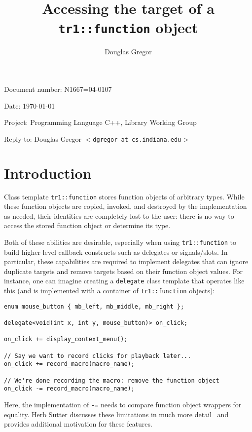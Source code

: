 \documentclass{article}
\begin{document}
\pagestyle{myheadings}

\title{Accessing the target of a \texttt{tr1::function} object}
\author{Douglas Gregor}
\date{}
\maketitle

\par\noindent Document number: N1667=04-0107
\par\noindent Date: \today
\par\noindent Project: Programming Language C++, Library Working Group
\par\noindent Reply-to: Douglas Gregor $<${\tt dgregor at cs.indiana.edu}$>$

\section{Introduction}
Class template \texttt{tr1::function} stores function objects of
arbitrary types. While these function objects are copied, invoked, and
destroyed by the implementation as needed, their identities are
completely lost to the user: there is no way to access the stored
function object or determine its type. 

Both of these abilities are desirable, especially when
using \texttt{tr1::function} to build higher-level callback constructs
such as delegates or signals/slots. In particular, these capabilities
are required to implement delegates that can ignore duplicate targets
and remove targets based on their function object values. For
instance, one can imagine creating a \texttt{delegate} class template
that operates like this (and is implemented with a container of
\texttt{tr1::function} objects):

\begin{verbatim}
enum mouse_button { mb_left, mb_middle, mb_right };

delegate<void(int x, int y, mouse_button)> on_click;

on_click += display_context_menu();

// Say we want to record clicks for playback later...
on_click += record_macro(macro_name);

// We're done recording the macro: remove the function object
on_click -= record_macro(macro_name);
\end{verbatim}

Here, the implementation of \texttt{-=} needs to compare function
object wrappers for equality. Herb Sutter discusses these limitations in much
more detail~\cite{Sutter03:Observer} and provides additional motivation for
these features.
\end{document}

